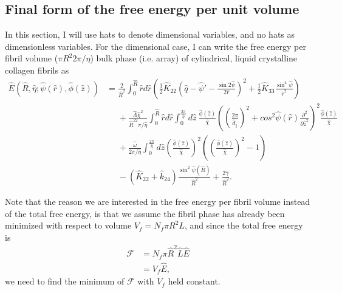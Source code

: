\documentclass[12pt]{article}
\begin{document}
\subsection{Final form of the free energy per unit volume}
In this section, I will use hats to denote dimensional variables, and no hats as dimensionless variables. For the dimensional case, I can write the free energy per fibril volume ($\pi R^2 2\pi/\eta$) bulk phase (i.e. array) of cylindrical, liquid crystalline collagen fibrils as
\begin{align}
\hat{E}(\hat{R},\hat{\eta};\hat{\psi}(\hat{r}),\hat{\phi}(\hat{z}))&=\frac{2}{\hat{R}^2}\int_0^{\hat{R}}\hat{r}d\hat{r}\left(\frac{1}{2}\hat{K}_{22}\left(\hat{q}-\hat{\psi}'-\frac{\sin2\hat{\psi}}{2\hat{r}}\right)^2+\frac{1}{2}\hat{K}_{33}\frac{\sin^4\hat{\psi}}{\hat{r}^2}\right)\nonumber\\
&\phantom{=}+\frac{\hat{\Lambda}\hat{\chi}^2}{\hat{R}^22\pi/\hat{\eta}}\int_0^{\hat{R}}\hat{r}d\hat{r}\int_0^{\frac{2\pi}{\hat{\eta}}}d\hat{z}\:\frac{\hat{\phi}(\hat{z})}{\hat{\chi}}\left(\left(\frac{2\pi}{\hat{d}_{\parallel}}\right)^2+cos^2\hat{\psi}(\hat{r})\frac{\partial^2}{\partial \hat{z}^2}\right)^2\!\!\frac{\hat{\phi}(\hat{z})}{\hat{\chi}}\nonumber\\
&\phantom{=}+\frac{\hat{\omega}}{2\pi/\hat{\eta}}\int_0^{\frac{2\pi}{\hat{\eta}}}d\hat{z}\left(\frac{\hat{\phi}(\hat{z})}{\hat{\chi}}\right)^2\left(\left(\frac{\hat{\phi}(\hat{z})}{\hat{\chi}}\right)^2-1\right)\nonumber\\
&\phantom{=}-(\hat{K}_{22}+\hat{k}_{24})\frac{\sin^2\hat{\psi}(\hat{R})}{\hat{R}^2}+\frac{2\hat{\gamma}}{\hat{R}^2}.
\end{align}

Note that the reason we are interested in the free energy per fibril volume instead of the total free energy, is that we assume the fibril phase has already been minimized with respect to volume $V_f=N_f\pi R^2 L$, and since the total free energy is
\begin{align}
\mathcal{F}&=N_f\pi \hat{R}^2\hat{L}\hat{E}\nonumber\\
&=V_f\hat{E},
\end{align}
we need to find the minimum of $\mathcal{F}$ with $V_f$ held constant.
\end{document}
